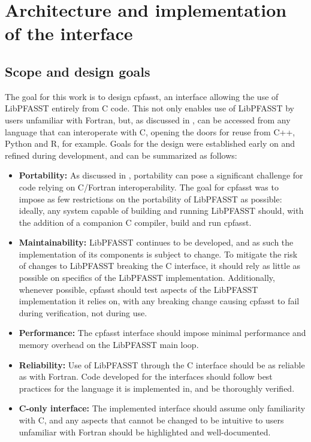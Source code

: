 \chapter{Architecture and implementation of the interface}
\label{chapter:implementation}

\section{Scope and design goals} \label{sec:impl_design_goals}

The goal for this work is to design cpfasst, an interface allowing the use of LibPFASST entirely from C code. This not only enables use of LibPFASST by users unfamiliar with Fortran, but, as discussed in , can be accessed from any language that can interoperate with C, opening the doors for reuse from C++, Python and R, for example. Goals for the design were established early on and refined during development, and can be summarized as follows:
\begin{itemize}
    \item \textbf{Portability:} As discussed in , portability can pose a significant challenge for code relying on C/Fortran interoperability. The goal for cpfasst was to impose as few restrictions on the portability of LibPFASST as possible: ideally, any system capable of building and running LibPFASST should, with the addition of a companion C compiler, build and run cpfasst.

    \item \textbf{Maintainability:} LibPFASST continues to be developed, and as such the implementation of its components is subject to change. To mitigate the risk of changes to LibPFASST breaking the C interface, it should rely as little as possible on specifics of the LibPFASST implementation. Additionally, whenever possible, cpfasst should test aspects of the LibPFASST implementation it relies on, with any breaking change causing cpfasst to fail during verification, not during use.

    \item \textbf{Performance:} The cpfasst interface should impose minimal performance and memory overhead on the LibPFASST main loop.

    \item \textbf{Reliability:} Use of LibPFASST through the C interface should be as reliable as with Fortran. Code developed for the interfaces should follow best practices for the language it is implemented in, and be thoroughly verified.

    \item \textbf{C-only interface:} The implemented interface should assume only familiarity with C, and any aspects that cannot be changed to be intuitive to users unfamiliar with Fortran should be highlighted and well-documented.
\end{itemize}

